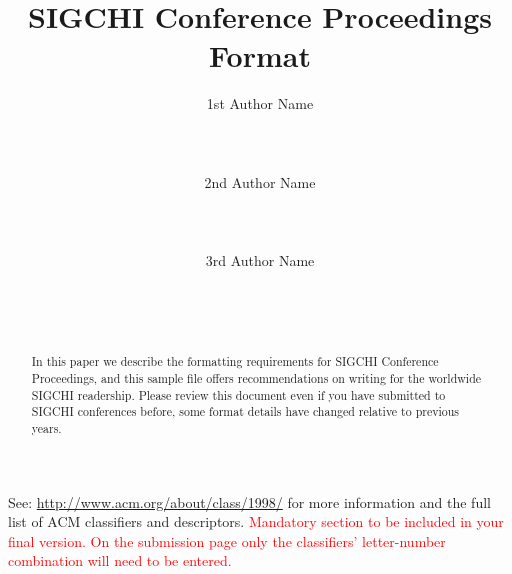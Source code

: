 \documentclass{sigchi}
\begin{document}
\title{SIGCHI Conference Proceedings Format}

\author{
  \alignauthor 1st Author Name\\
    \\
    \\
    \\
  \alignauthor 2nd Author Name\\
    \\
    \\
    \\
  \alignauthor 3rd Author Name\\
    \\
    \\
    \\
}

\maketitle

\begin{abstract}
In this paper we describe the formatting requirements for
SIGCHI Conference Proceedings, and this sample file
offers recommendations on writing for the worldwide
SIGCHI readership. Please review this document even if
you have submitted to SIGCHI conferences before, some
format details have changed relative to previous years.
\end{abstract}



See: \url{http://www.acm.org/about/class/1998/}
for more information and the full list of ACM classifiers
and descriptors. 
\textcolor{red}{Mandatory section to be included in your
final version. On the submission page only the classifiers'
letter-number combination will need to be entered.}

\end{document}
